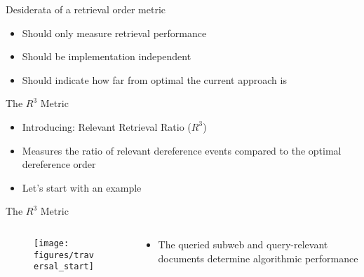 \begin{frame}{Desiderata of a retrieval order metric}
    \begin{itemize}
        \item Should only measure retrieval performance
        \item Should be implementation independent
        \item Should indicate how far from optimal the current approach is
    \end{itemize}
\end{frame}

\begin{frame}{The $ R^{3} $ Metric}
    \begin{itemize}
        \item Introducing: Relevant Retrieval Ratio ($ R^{3} $)
        \item Measures the ratio of relevant dereference events compared to the optimal dereference order
        \item Let's start with an example
    \end{itemize}
\end{frame}

\begin{frame}{The $ R^{3} $ Metric}
    \begin{columns}[T] %
        \begin{column}{.48\textwidth}

       \begin{figure}
            \centering
            \texttt{[image: figures/traversal\_start]}
        \end{figure}

        \end{column}%
        \hfill%
        \begin{column}{.48\textwidth}
            \bigskip
            \begin{itemize}
                \item The queried subweb and query-relevant documents determine algorithmic performance
            \end{itemize}
        \end{column}%
    \end{columns}
\end{frame}

